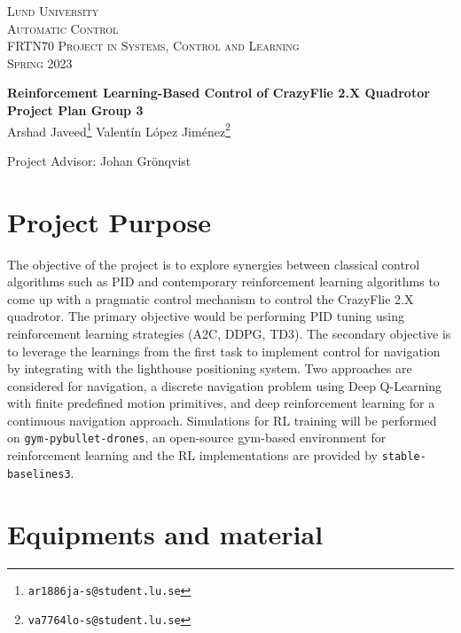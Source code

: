 \documentclass{article}
\begin{document}
\begin{titlepage}
  \begin{flushleft}\scshape
    Lund University\\
    Automatic Control\\[\smallskipamount]
    FRTN70 Project in Systems, Control and Learning\\
    Spring 2023
  \end{flushleft}
  \vspace*{0pt plus 0.3fill}
  \begin{center}
    \huge \textbf{Reinforcement Learning-Based Control of CrazyFlie 2.X Quadrotor}\\[4mm]     
    \large\textbf{Project Plan Group 3}\\[5mm]
         Arshad Javeed\footnote{\texttt{ar1886ja-s@student.lu.se}}\quad
         Valentín López Jiménez\footnote{\texttt{va7764lo-s@student.lu.se}}\quad
  \end{center}
\begin{center}
    Project Advisor: Johan Grönqvist
\end{center}
\vfill
\end{titlepage}        

\section{Project Purpose}
The objective of the project is to explore synergies between classical control algorithms such as PID and contemporary reinforcement learning algorithms to come up with a pragmatic control mechanism to control the CrazyFlie 2.X quadrotor. The primary objective would be performing PID tuning using reinforcement learning strategies (A2C, DDPG, TD3). The secondary objective is to leverage the learnings from the first task to implement control for navigation by integrating with the lighthouse positioning system. Two approaches are considered for navigation, a discrete navigation problem using Deep Q-Learning with finite predefined motion primitives, and deep reinforcement learning for a continuous navigation approach. Simulations for RL training will be performed on \verb|gym-pybullet-drones|\cite{pybullet_gym}, an open-source gym-based environment for reinforcement learning and the RL implementations are provided by \verb|stable-baselines3|\cite{stable-baselines3}. 

\section{Equipments and material} \label{sec:equipment}
\end{document}
